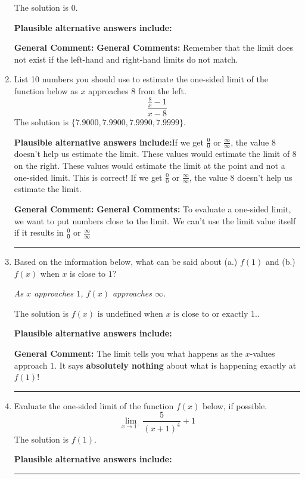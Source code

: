 \documentclass{extbook}[14pt]
\newcommand{\litem}[1]{\item #1

\rule{\textwidth}{0.4pt}}
\begin{document}
\begin{enumerate}
{The solution is \( 0 \).\begin{enumerate}[label=\Alph*.]
\textbf{Plausible alternative answers include:}




\end{enumerate}

\textbf{General Comment:} \textbf{General Comments:} Remember that the limit does not exist if the left-hand and right-hand limits do not match.
}
\litem{
List 10 numbers you should use to estimate the one-sided limit of the function below as $x$ approaches 8 from the left.
\[ \frac{\frac{8}{x} - 1}{x - 8} \]The solution is \( \{ 7.9000, 7.9900, 7.9990, 7.9999 \} \).\begin{enumerate}[label=\Alph*.]
\textbf{Plausible alternative answers include:}If we get $\frac{0}{0}$ or $\frac{\infty}{\infty}$, the value 8 doesn't help us estimate the limit.
These values would estimate the limit of 8 on the right.
These values would estimate the limit at the point and not a one-sided limit.
This is correct!
If we get $\frac{0}{0}$ or $\frac{\infty}{\infty}$, the value 8 doesn't help us estimate the limit.
\end{enumerate}

\textbf{General Comment:} \textbf{General Comments:} To evaluate a one-sided limit, we want to put numbers close to the limit. We can't use the limit value itself if it results in $\frac{0}{0}$ or $\frac{\infty}{\infty}$
}
\litem{
Based on the information below, what can be said about (a.) $f(1)$ and (b.) $f(x)$ when $x$ is close to $1$?

\begin{center}
    \textit{ As $x$ approaches $1$, $f(x)$ approaches $\infty$. }
\end{center}
The solution is \( f(x) \text{ is undefined when } x \text{ is close to or exactly } 1. \).\begin{enumerate}[label=\Alph*.]
\textbf{Plausible alternative answers include:}




\end{enumerate}

\textbf{General Comment:} The limit tells you what happens as the $x$-values approach $1$. It says \textbf{absolutely nothing} about what is happening exactly at $f(1)$!
}
\litem{
Evaluate the one-sided limit of the function $f(x)$ below, if possible.
\[ \lim_{x \rightarrow 1^-} \frac{5}{(x+1)^4}+1 \]The solution is \( f(1) \).\begin{enumerate}[label=\Alph*.]
\textbf{Plausible alternative answers include:}





\end{enumerate}}
\end{enumerate}
\end{document}
